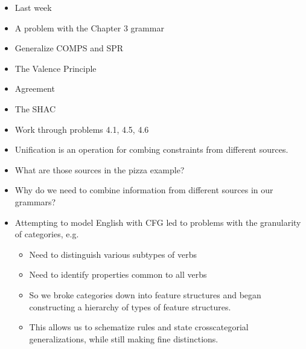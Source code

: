 \documentclass[a4paper,landscape,headrule,footrule]{foils}
\begin{document}
\avmfont{\it}

\maketitle


\begin{itemize}
\item Last week
\item A problem with the Chapter 3 grammar
\item Generalize COMPS and SPR
\item The Valence Principle
\item Agreement
\item The SHAC
\item Work through problems 4.1, 4.5, 4.6
\end{itemize}

\MyLogo{}
\begin{itemize}
\item Unification is an operation for combing
constraints from different sources.

\item What are those sources in the pizza
example?

\item Why do we need to combine information
from different sources in our grammars?
\end{itemize}

\begin{itemize}
\item Attempting to model English with CFG led to problems
  with the granularity of categories, e.g.
  \begin{itemize}
  \item Need to distinguish various subtypes of verbs
  \item Need to identify properties common to all verbs
  \end{itemize}
\begin{itemize}
\item So we broke categories down into feature structures and
  began constructing a hierarchy of types of feature
  structures.
\item This allows us to schematize rules and state crosscategorial
  generalizations, while still making fine distinctions.
\end{itemize}
\end{itemize}
\end{document}
